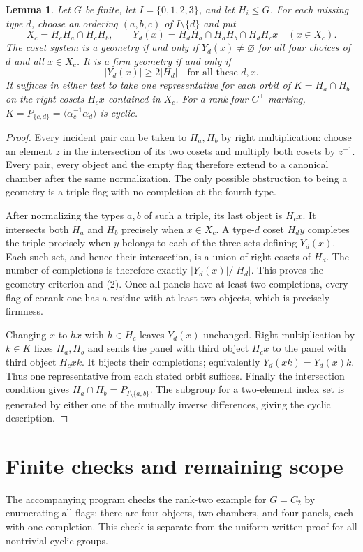 \documentclass[11pt]{article}
\newtheorem{lemma}[proposition]{Lemma}
\newcommand{\gen}[1]{\langle #1\rangle}
\begin{document}
\begin{lemma}
Let $G$ be finite, let $I=\{0,1,2,3\}$, and let $H_i\leq G$.
For each missing type $d$, choose an ordering $(a,b,c)$ of
$I\setminus\{d\}$ and put
\[
 X_c=H_cH_a\cap H_cH_b,\qquad
 Y_d(x)=H_dH_a\cap H_dH_b\cap H_dH_cx \quad(x\in X_c).
 \tag{1}
\]
The coset system is a geometry if and only if $Y_d(x)\ne\varnothing$
for all four choices of $d$ and all $x\in X_c$. It is a firm geometry
if and only if
\[
 |Y_d(x)|\geq 2|H_d| \quad\text{for all these }d,x.
 \tag{2}
\]
It suffices in either test to take one representative for each orbit of
$K=H_a\cap H_b$ on the right cosets $H_cx$ contained in $X_c$.
For a rank-four $C^+$ marking,
$K=P_{\{c,d\}}=\gen{\alpha_c^{-1}\alpha_d}$ is cyclic.
\end{lemma}
\begin{proof}
Every incident pair can be taken to $H_a,H_b$ by right multiplication:
choose an element $z$ in the intersection of its two cosets and
multiply both cosets by $z^{-1}$. Every pair, every object and the empty
flag therefore extend to a canonical chamber after the same
normalization. The only possible obstruction to being a geometry is a
triple flag with no completion at the fourth type.

After normalizing the types $a,b$ of such a triple, its last object is
$H_cx$. It intersects both $H_a$ and $H_b$ precisely when $x\in X_c$.
A type-$d$ coset $H_dy$ completes the triple precisely when $y$ belongs
to each of the three sets defining $Y_d(x)$. Each such set, and hence
their intersection, is a union of right cosets of $H_d$. The number of
completions is therefore exactly $|Y_d(x)|/|H_d|$. This proves the
geometry criterion and (2). Once all panels have at least two
completions, every flag of corank one has a residue with at least two
objects, which is precisely firmness.

Changing $x$ to $h x$ with $h\in H_c$ leaves $Y_d(x)$ unchanged.
Right multiplication by $k\in K$ fixes $H_a,H_b$ and sends the panel
with third object $H_cx$ to the panel with third object $H_cxk$.
It bijects their completions; equivalently $Y_d(xk)=Y_d(x)k$.
Thus one representative from each stated orbit suffices.
Finally the intersection condition gives
$H_a\cap H_b=P_{I\setminus\{a,b\}}$.
The subgroup for a two-element index set is generated by either one of
the mutually inverse differences, giving the cyclic description.
\end{proof}

\section{Finite checks and remaining scope}
The accompanying program checks the rank-two example for $G=C_2$ by
enumerating all flags: there are four objects, two chambers, and four
panels, each with one completion. This check is separate from the
uniform written proof for all nontrivial cyclic groups.
\end{document}
